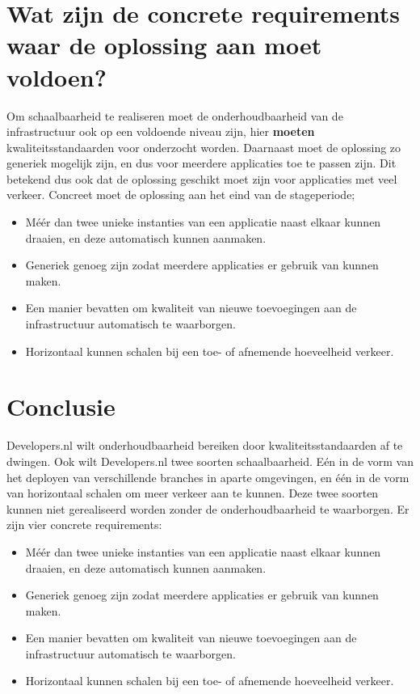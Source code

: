 \section{Wat zijn de concrete requirements waar de oplossing aan moet voldoen?}

Om schaalbaarheid te realiseren moet de onderhoudbaarheid van de infrastructuur ook op een voldoende niveau zijn, hier \textbf{moeten} kwaliteitsstandaarden voor onderzocht worden. Daarnaast moet de oplossing zo generiek mogelijk zijn, en dus voor meerdere applicaties toe te passen zijn. Dit betekend dus ook dat de oplossing geschikt moet zijn voor applicaties met veel verkeer. Concreet moet de oplossing aan het eind van de stageperiode;

\begin{itemize}
	\item Méér dan twee unieke instanties van een applicatie naast elkaar kunnen draaien, en deze automatisch kunnen aanmaken.
	\item Generiek genoeg zijn zodat meerdere applicaties er gebruik van kunnen maken.
	\item Een manier bevatten om kwaliteit van nieuwe toevoegingen aan de infrastructuur automatisch te waarborgen.
	\item Horizontaal kunnen schalen bij een toe- of afnemende hoeveelheid verkeer.
\end{itemize}

\section{Conclusie}

Developers.nl wilt onderhoudbaarheid bereiken door kwaliteitsstandaarden af te dwingen. Ook wilt Developers.nl twee soorten schaalbaarheid. Eén in de vorm van het deployen van verschillende branches in aparte omgevingen, en één in de vorm van horizontaal schalen om meer verkeer aan te kunnen. Deze twee soorten kunnen niet gerealiseerd worden zonder de onderhoudbaarheid te waarborgen. Er zijn vier concrete requirements:

\begin{itemize}
	\item Méér dan twee unieke instanties van een applicatie naast elkaar kunnen draaien, en deze automatisch kunnen aanmaken.
	\item Generiek genoeg zijn zodat meerdere applicaties er gebruik van kunnen maken.
	\item Een manier bevatten om kwaliteit van nieuwe toevoegingen aan de infrastructuur automatisch te waarborgen.
	\item Horizontaal kunnen schalen bij een toe- of afnemende hoeveelheid verkeer.
\end{itemize}
